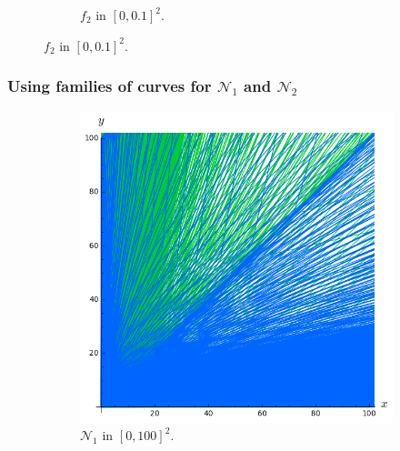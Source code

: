 \documentclass{beamer}
\begin{document}
\begin{frame}
\begin{figure}
\begin{subfigure}{.28\linewidth}
\vspace{-0.1cm}\caption{$f_2$ in $[0, 0.1]^2$.}
\end{subfigure}
\end{figure}
\end{frame}

\begin{frame}
\frametitle{Using families of curves for $\mathcal{N}_1$ and $\mathcal{N}_2$}

\begin{figure}
\vspace{-0.2cm}
\begin{subfigure}{.28\linewidth}\centering
\includegraphics[width=1\textwidth]{plots/ch5_newCurves2.png}
\vspace{-0.1cm}\caption{$\mathcal{N}_1$ in $[0, 100]^2$.}
\end{subfigure} \hspace{0.4cm}
\begin{subfigure}{.28\linewidth}\centering

\end{subfigure}
\end{figure}
\end{frame}
\end{document}

